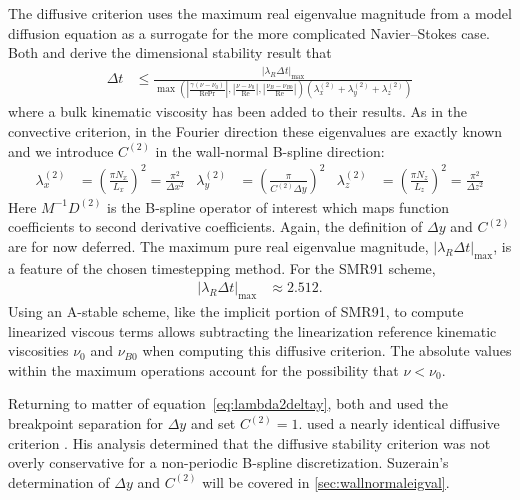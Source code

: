 \documentclass[letterpaper,11pt,nointlimits,reqno,draft]{amsbook}
\begin{document}
The diffusive criterion uses the maximum real eigenvalue magnitude from a model
diffusion equation as a surrogate for the more complicated Navier--Stokes case.
Both \citet[equation~2.40]{Kwok2002} and \citet[equations~4.29--30]{Guarini1998}
derive the dimensional stability result that
\begin{align}\label{eq:diffusivestability}
    \Delta{}t &\leq
    \frac{
        \left|\lambda_{R}\Delta_{}t\right|_{\max}
    }{
      \max\left(
        \left|\frac{\gamma\left(\nu-\nu_{0}\right)}{\mbox{Re}\mbox{Pr}}\right|,
        \left|\frac{\nu-\nu_{0}}{\mbox{Re}}\right|,
        \left|\frac{\nu_{B}-\nu_{B0}}{\mbox{Re}}\right|
      \right)
      \left(
          \lambda^{(2)}_x
        + \lambda^{(2)}_y
        + \lambda^{(2)}_z
      \right)
    }
\end{align}
where a bulk kinematic viscosity has been added to their results.  As in the
convective criterion, in the Fourier direction these eigenvalues are exactly
known and we introduce $C^{(2)}$ in the wall-normal B-spline direction:
\begin{align}\label{eq:lambda2deltay}
    \lambda^{(2)}_x &= \left(\frac{\pi N_x}{L_x}\right)^2
                     = \frac{\pi^2}{\Delta{}x^2}
    &
    \lambda^{(2)}_y &= \left(\frac{\pi}{C^{(2)} \Delta{}y}\right)^2
    &
    \lambda^{(2)}_z &= \left(\frac{\pi N_z}{L_z}\right)^2
                     = \frac{\pi^2}{\Delta{}z^2}
\end{align}
Here $M^{-1}D^{(2)}$ is the B-spline operator of interest which maps function
coefficients to second derivative coefficients.  Again, the definition of
$\Delta{}y$ and $C^{(2)}$ are for now deferred.  The maximum pure real
eigenvalue magnitude, $\left|\lambda_{R}\Delta{}t\right|_{\max}$, is a feature
of the chosen timestepping method.  For the SMR91 scheme,
\begin{align}
\left|\lambda_{R}\Delta{}t\right|_{\max} &\approx 2.512.
\end{align}
Using an A-stable scheme, like the implicit portion of SMR91, to compute
linearized viscous terms allows subtracting the linearization reference
kinematic viscosities $\nu_0$ and $\nu_{B0}$ when computing this diffusive
criterion.  The absolute values within the maximum operations account for the
possibility that $\nu<\nu_{0}$.

Returning to matter of equation~\eqref{eq:lambda2deltay}, both
\citeauthor{Guarini1998} and \citeauthor{Kwok2002} used the breakpoint
separation for $\Delta{}y$ and set $C^{(2)} = 1$.  \citeauthor{Venugopal2003}
used a nearly identical diffusive criterion
\citep[equation~3.15]{Venugopal2003}.  His analysis determined that the
diffusive stability criterion was not overly conservative for a non-periodic
B-spline discretization.  Suzerain's determination of $\Delta{}y$ and $C^{(2)}$
will be covered in \autoref{sec:wallnormaleigval}.
\end{document}
